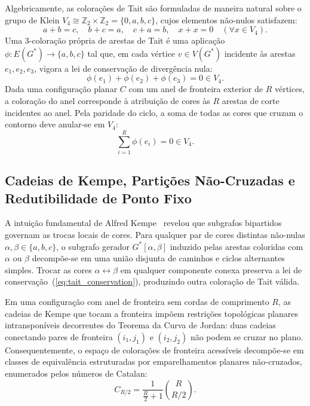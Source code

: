 \documentclass[11pt,a4paper]{article}
\theoremstyle{plain}
\theoremstyle{definition}
\begin{document}
Algebricamente, as colorações de Tait são formuladas de maneira natural sobre o grupo de Klein $V_4 \cong \mathbb{Z}_2 \times \mathbb{Z}_2 = \{0, a, b, c\}$, cujos elementos não-nulos satisfazem:
\begin{equation}
a + b = c, \quad b + c = a, \quad c + a = b, \quad x + x = 0 \quad (\forall x \in V_4).
\end{equation}
Uma 3-coloração própria de arestas de Tait é uma aplicação $\phi: E(G^*) \to \{a, b, c\}$ tal que, em cada vértice $v \in V(G^*)$ incidente às arestas $e_1, e_2, e_3$, vigora a lei de conservação de divergência nula:
\begin{equation}
\phi(e_1) + \phi(e_2) + \phi(e_3) = 0 \in V_4.
\label{eq:tait_conservation}
\end{equation}
Dada uma configuração planar $C$ com um anel de fronteira exterior de $R$ vértices, a coloração do anel corresponde à atribuição de cores às $R$ arestas de corte incidentes ao anel. Pela paridade do ciclo, a soma de todas as cores que cruzam o contorno deve anular-se em $V_4$:
\begin{equation}
\sum_{i=1}^R \phi(e_i) = 0 \in V_4.
\end{equation}

\subsection{Cadeias de Kempe, Partições Não-Cruzadas e Redutibilidade de Ponto Fixo}

A intuição fundamental de Alfred Kempe~\cite{kempe1879geographical} revelou que subgrafos bipartidos governam as trocas locais de cores. Para qualquer par de cores distintas não-nulas $\alpha, \beta \in \{a, b, c\}$, o subgrafo gerador $G^*[\alpha, \beta]$ induzido pelas arestas coloridas com $\alpha$ ou $\beta$ decompõe-se em uma união disjunta de caminhos e ciclos alternantes simples. Trocar as cores $\alpha \leftrightarrow \beta$ em qualquer componente conexa preserva a lei de conservação~(\ref{eq:tait_conservation}), produzindo outra coloração de Tait válida.

Em uma configuração com anel de fronteira sem cordas de comprimento $R$, as cadeias de Kempe que tocam a fronteira impõem restrições topológicas planares intransponíveis decorrentes do Teorema da Curva de Jordan: duas cadeias conectando pares de fronteira $(i_1, j_1)$ e $(i_2, j_2)$ não podem se cruzar no plano. Consequentemente, o espaço de colorações de fronteira acessíveis decompõe-se em classes de equivalência estruturadas por emparelhamentos planares não-cruzados, enumerados pelos números de Catalan:
\begin{equation}
C_{R/2} = \frac{1}{\frac{R}{2} + 1} \binom{R}{R/2}.
\end{equation}
\end{document}
